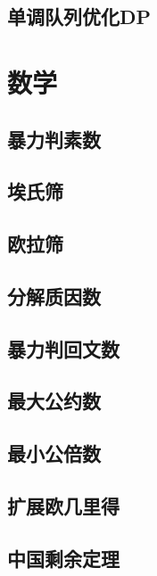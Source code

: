 \section{单调队列优化DP}
\raggedbottom
\hrulefill

\chapter{数学}
\section{暴力判素数}
\raggedbottom
\hrulefill
\section{埃氏筛}
\raggedbottom
\hrulefill
\section{欧拉筛}
\raggedbottom
\hrulefill
\section{分解质因数}
\raggedbottom
\hrulefill
\section{暴力判回文数}
\raggedbottom
\hrulefill
\section{最大公约数}
\raggedbottom
\hrulefill
\section{最小公倍数}
\raggedbottom
\hrulefill
\section{扩展欧几里得}
\raggedbottom
\hrulefill
\section{中国剩余定理}
\raggedbottom
\hrulefill
